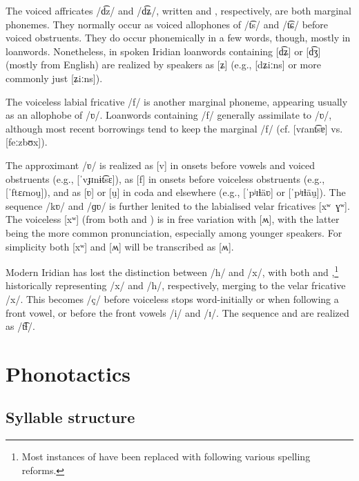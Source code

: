The voiced affricates /d͡z/ and /d͡ʑ/, written  and ,
respectively, are both marginal phonemes. They normally occur as voiced
allophones of  /t͡s/ and /t͡ɕ/ before voiced obstruents. They do occur
phonemically in a few words, though, mostly in loanwords. Nonetheless, in spoken
Iridian loanwords containing [d͡ʑ] or [d͡ʒ] (mostly from English) are realized
by speakers as [ʑ] (e.g.,  [dʑiːns] or more commonly just
[ʑiːns]).

The voiceless labial fricative /f/ is another marginal phoneme, appearing
usually as an allophobe of /ʋ/. Loanwords containing /f/ generally assimilate to
/ʋ/, although most recent borrowings tend to keep the marginal /f/ (cf.
 [vɾant͡sɐ] vs.  [feːzbʊx]).

The approximant /ʋ/ is realized as [v] in onsets before vowels and voiced
obstruents (e.g.,  [ˈvɟɪnɨt͡sɛ]), as [f] in
onsets before voiceless obstruents (e.g.,  [ˈftɛɾnou̯]),
and as [ʋ] or [u̯] in coda and elsewhere (e.g.,  [ˈpʲɪɫäʋ]
or [ˈpʲɪɫäu̯]). The sequence /kʋ/ and /ɡʋ/ is further lenited to the labialised
velar fricatives [xʷ~ɣʷ]. The voiceless [xʷ] (from both  and )
is in free variation with [ʍ], with the latter being the more common
pronunciation, especially among younger speakers. For simplicity both [xʷ] and
[ʍ] will be transcribed as [ʍ].

Modern Iridian has lost the distinction between /h/ and /x/, with both 
and ,\footnote{Most instances of  have been replaced with
 following various spelling reforms.} historically representing /x/ and
/h/, respectively, merging to the velar fricative /x/. This becomes /ç/ before
voiceless stops word-initially or when following a front vowel, or before the
front vowels /i/ and /ɪ/. The sequence  and  are realized as
/t͡ɬ/.

\section{Phonotactics}\label{sec:phonotactics}

\subsection{Syllable structure}\label{sec:syllable-structure}

